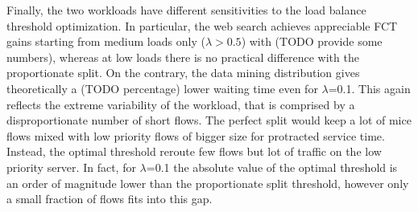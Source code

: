 Finally, the two workloads have different sensitivities to the load balance threshold optimization. In particular, the web search achieves appreciable FCT gains starting from medium loads only ($\lambda > 0.5$) with (TODO provide some numbers), whereas at low loads there is no practical difference with the proportionate split. On the contrary, the data mining distribution gives theoretically a (TODO percentage) lower waiting time even for $\lambda$=0.1. This again reflects the extreme variability of the workload, that is comprised by a disproportionate number of short flows. The perfect split would keep a lot of mice flows mixed with low priority flows of bigger size for protracted service time. Instead, the optimal threshold reroute few flows but lot of traffic on the low priority server. In fact, for $\lambda$=0.1 the absolute value of the optimal threshold is an order of magnitude lower than the proportionate split threshold, however only a small fraction of flows fits into this gap. 

